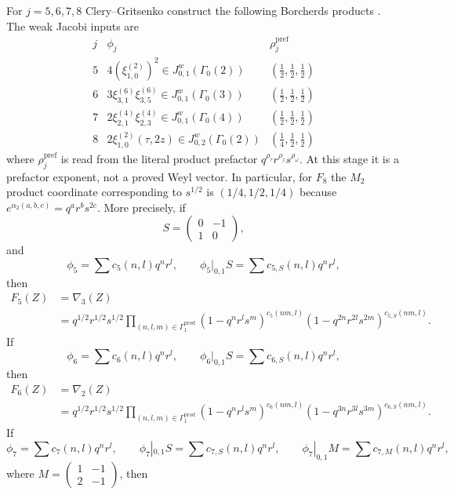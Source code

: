 \documentclass[11pt]{memoir}
\begin{document}
\begin{proposition}
\label{prop:gc-row-data}
For $j=5,6,7,8$ Clery--Gritsenko construct the following Borcherds
products \cite{GC}.  The weak Jacobi inputs are
$$
\begin{array}{c|c|c}
j&\phi_j&\rho_j^{\mathrm{pref}}\\ \hline
5&4(\xi_{1,0}^{(2)})^2\in J^w_{0,1}(\Gamma_0(2))
&(\frac12,\frac12,\frac12)\\
6&3\xi_{3,1}^{(6)}\xi_{3,5}^{(6)}
\in J^w_{0,1}(\Gamma_0(3))
&(\frac12,\frac12,\frac12)\\
7&2\xi_{2,1}^{(4)}\xi_{2,3}^{(4)}
\in J^w_{0,1}(\Gamma_0(4))
&(\frac12,\frac12,\frac12)\\
8&2\xi_{1,0}^{(2)}(\tau,2z)\in J^w_{0,2}(\Gamma_0(2))
&(\frac14,\frac12,\frac12)
\end{array}
$$
where $\rho_j^{\mathrm{pref}}$ is read from the literal product
prefactor $q^{\rho_{\tau}}r^{\rho_z}s^{\rho_{\omega}}$.  At this
stage it is a prefactor exponent, not a proved Weyl vector.  In
particular, for $F_8$ the $M_2$ product coordinate corresponding to
$s^{1/2}$ is $(1/4,1/2,1/4)$ because
$e^{\alpha_2(a,b,c)}=q^ar^bs^{2c}$.
More precisely, if
$$S=\left(\begin{smallmatrix}0&-1\\1&0\end{smallmatrix}\right),$$
and
$$
\phi_5=\sum c_5(n,l)q^nr^l,\qquad
\phi_5|_{0,1}S=\sum c_{5,S}(n,l)q^nr^l,
$$
then
$$
\begin{aligned}
F_5(Z)&=\nabla_3(Z)\\
&=q^{1/2}r^{1/2}s^{1/2}
\prod_{(n,l,m)\in\Gamma_1^{\mathrm{prod}}}
(1-q^nr^ls^m)^{c_5(nm,l)}
(1-q^{2n}r^{2l}s^{2m})^{c_{5,S}(nm,l)}.
\end{aligned}
$$
If
$$
\phi_6=\sum c_6(n,l)q^nr^l,\qquad
\phi_6|_{0,1}S=\sum c_{6,S}(n,l)q^nr^l,
$$
then
$$
\begin{aligned}
F_6(Z)&=\nabla_2(Z)\\
&=q^{1/2}r^{1/2}s^{1/2}
\prod_{(n,l,m)\in\Gamma_1^{\mathrm{prod}}}
(1-q^nr^ls^m)^{c_6(nm,l)}
(1-q^{3n}r^{3l}s^{3m})^{c_{6,S}(nm,l)}.
\end{aligned}
$$
If
$$
\phi_7=\sum c_7(n,l)q^nr^l,\qquad
\phi_7|_{0,1}S=\sum c_{7,S}(n,l)q^nr^l,\qquad
\phi_7|_{0,1}M=\sum c_{7,M}(n,l)q^nr^l,
$$
where $M=\left(\begin{smallmatrix}1&-1\\2&-1\end{smallmatrix}\right)$, then
$$
\begin{aligned}

\end{aligned}$$
\end{proposition}
\end{document}
